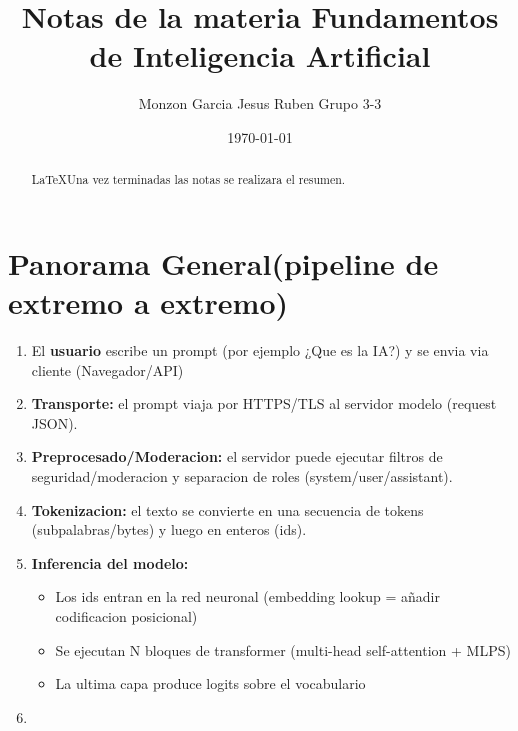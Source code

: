 \documentclass{article}
\title{Notas de la materia Fundamentos de Inteligencia Artificial}
\author{Monzon Garcia Jesus Ruben Grupo 3-3}
\date{ \today }
\begin{document}
\sloppy
\maketitle
\begin{abstract}
    \noindent \LaTeX  Una vez terminadas las notas se realizara el resumen.
\end{abstract}

\section*{Panorama General(pipeline de extremo a extremo)}

\begin{enumerate}
    \item El \textbf{usuario} escribe un prompt (por ejemplo ¿Que es la IA?) y se envia via cliente (Navegador/API)
    \item \textbf{Transporte:} el prompt viaja por HTTPS/TLS al servidor modelo (request JSON).
    \item \textbf{Preprocesado/Moderacion:} el servidor puede ejecutar filtros de seguridad/moderacion y separacion de roles (system/user/assistant).
    \item \textbf{Tokenizacion:} el texto se convierte en una secuencia de tokens (subpalabras/bytes) y luego en enteros (ids).
    \item \textbf{Inferencia del modelo:}
        \begin{itemize}
            \item Los ids entran en la red neuronal (embedding lookup = añadir codificacion posicional)
            \item Se ejecutan N bloques de transformer (multi-head self-attention + MLPS)
            \item La ultima capa produce logits sobre el vocabulario
        \end{itemize}
    \item 
        
\end{enumerate}



\printbibliography
\end{document}
